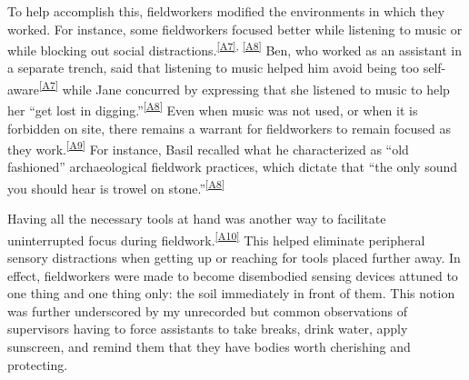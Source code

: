 To help accomplish this, fieldworkers modified the environments in which they worked.
For instance, some fieldworkers focused better while listening to music or while blocking out social distractions.\textsuperscript{\ref{A7}, \ref{A8}}
Ben, who worked as an assistant in a separate trench, said that listening to music helped him avoid being too self-aware\textsuperscript{\ref{A7}} while Jane concurred by expressing that she listened to music to help her ``get lost in digging.''\textsuperscript{\ref{A8}}
Even when music was not used, or when it is forbidden on site, there remains a warrant for fieldworkers to remain focused as they work.\textsuperscript{\ref{A9}}
For instance, Basil recalled what he characterized as ``old fashioned'' archaeological fieldwork practices, which dictate that ``the only sound you should hear is trowel on stone.''\textsuperscript{\ref{A8}}

Having all the necessary tools at hand was another way to facilitate uninterrupted focus during fieldwork.\textsuperscript{\ref{A10}}
This helped eliminate peripheral sensory distractions when getting up or reaching for tools placed further away.
In effect, fieldworkers were made to become disembodied sensing devices attuned to one thing and one thing only: the soil immediately in front of them.
This notion was further underscored by my unrecorded but common observations of supervisors having to force assistants to take breaks, drink water, apply sunscreen, and remind them that they have bodies worth cherishing and protecting.

